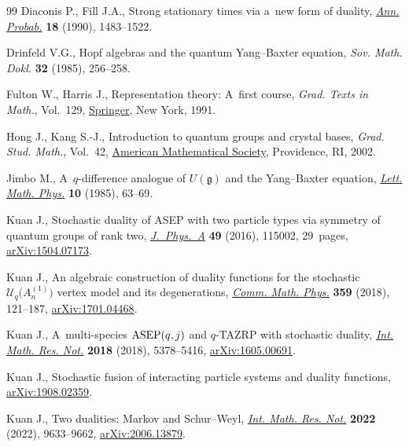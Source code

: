 \begin{thebibliography}{99}
Diaconis P., Fill J.A., Strong stationary times via a~new form of duality,
 \href{https://doi.org/10.1214/aop/1176990628}{\textit{Ann. Probab.}}
 \textbf{18} (1990), 1483--1522.

Drinfeld V.G., Hopf algebras and the quantum {Y}ang--{B}axter equation,
 \textit{Sov. Math. Dokl.} \textbf{32} (1985), 256--258.

Fulton W., Harris J., Representation theory: {A}~first course, \textit{Grad.
 Texts in Math.}, Vol.~129,
 \href{https://doi.org/10.1007/978-1-4612-0979-9}{Springer}, New York, 1991.

Hong J., Kang S.-J., Introduction to quantum groups and crystal bases,
 \textit{Grad. Stud. Math.}, Vol.~42,
 \href{https://doi.org/10.1090/gsm/042}{American Mathematical Society},
 Providence, RI, 2002.

Jimbo M., A~{$q$}-difference analogue of {$U({\mathfrak g})$} and the
 {Y}ang--{B}axter equation,
 \href{https://doi.org/10.1007/BF00704588}{\textit{Lett. Math. Phys.}}
 \textbf{10} (1985), 63--69.

Kuan J., Stochastic duality of {ASEP} with two particle types via symmetry of
 quantum groups of rank two,
 \href{https://doi.org/10.1088/1751-8113/49/11/115002}{\textit{J.~Phys.~A}}
 \textbf{49} (2016), 115002, 29~pages,
 \href{https://arxiv.org/abs/1504.07173}{arXiv:1504.07173}.

Kuan J., An algebraic construction of duality functions for the stochastic
 {$\mathcal{U}_q\bigl( A_n^{(1)}\bigr)$} vertex model and its degenerations,
 \href{https://doi.org/10.1007/s00220-018-3108-x}{\textit{Comm. Math. Phys.}}
 \textbf{359} (2018), 121--187,
 \href{https://arxiv.org/abs/1701.04468}{arXiv:1701.04468}.

Kuan J., A~multi-species {${\rm ASEP}(q,j)$} and {$q$}-{TAZRP} with stochastic
 duality, \href{https://doi.org/10.1093/imrn/rnx034}{\textit{Int. Math. Res.
 Not.}} \textbf{2018} (2018), 5378--5416,
 \href{https://arxiv.org/abs/1605.00691}{arXiv:1605.00691}.

Kuan J., Stochastic fusion of interacting particle systems and duality
 functions, \href{https://arxiv.org/abs/1908.02359}{arXiv:1908.02359}.

Kuan J., Two dualities: {M}arkov and {S}chur--{W}eyl,
 \href{https://doi.org/10.1093/imrn/rnaa333}{\textit{Int. Math. Res. Not.}}
 \textbf{2022} (2022), 9633--9662,
 \href{https://arxiv.org/abs/2006.13879}{arXiv:2006.13879}.


\end{thebibliography}
